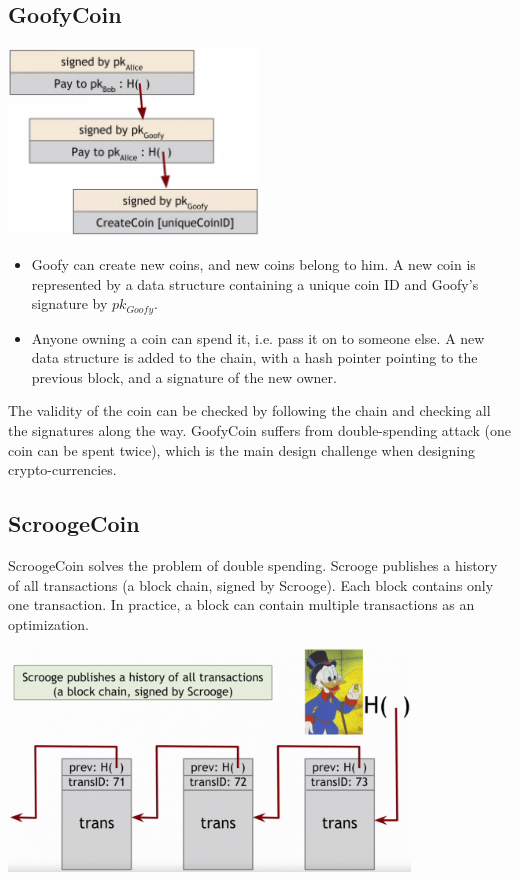 \subsection{GoofyCoin}
\begin{center}
  \includegraphics[width=0.5\textwidth]{goofy.png}
\end{center}
\begin{itemize}
\item Goofy can create new coins, and new coins belong to him. A new coin is represented by a data structure containing a unique coin ID and Goofy's signature by $pk_{Goofy}$.
\item Anyone owning a coin can spend it, i.e. pass it on to someone else. A new data structure is added to the chain, with a hash pointer pointing to the previous block, and a signature of the new owner.
\end{itemize}
The validity of the coin can be checked by following the chain and checking all the signatures along the way. GoofyCoin suffers from double-spending attack (one coin can be spent twice), which is the main design challenge when designing crypto-currencies.
\subsection{ScroogeCoin}
ScroogeCoin solves the problem of double spending. Scrooge publishes a history of all transactions (a block chain, signed by Scrooge). Each block contains only one transaction. In practice, a block can contain multiple transactions as an optimization. 
\begin{center}
  \includegraphics[width=0.8\textwidth]{scrooge.png}
\end{center}
